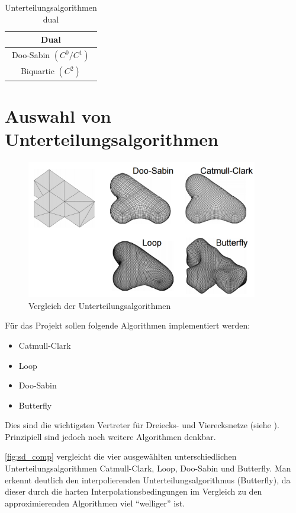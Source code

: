 \begin{table}
\center
\caption{Unterteilungsalgorithmen dual \cite[S. 65]{Zorin.subdivcourse} \cite{Standford.24.07.2015}}
\label{tab:sd_comp_dual}
\begin{tabular}{c}
\\
\hline
\textbf{Dual}\\
\hline
Doo-Sabin \((C^0/C^1)\) \\
Biquartic \((C^2)\) \\
\end{tabular}
\end{table}

\section{Auswahl von Unterteilungsalgorithmen}

\begin{figure}
  \centering
  \includegraphics[width=0.9\textwidth]{content/media/sd_overview.png}
  \caption{Vergleich der Unterteilungsalgorithmen \cite{Standford.24.07.2015}}
  \label{fig:sd_comp}
\end{figure}

Für das Projekt sollen folgende Algorithmen implementiert werden:
\begin{itemize}
	\item Catmull-Clark
	\item Loop
	\item Doo-Sabin
	\item Butterfly
\end{itemize}
Dies sind die wichtigsten Vertreter für Dreiecks- und Vierecksnetze
(siehe \cite[S. 65ff]{Zorin.subdivcourse} \cite{Standford.24.07.2015}).
Prinzipiell sind jedoch noch weitere Algorithmen denkbar.

\autoref{fig:sd_comp} vergleicht die vier ausgewählten
unterschiedlichen Unterteilungsalgorithmen Catmull-Clark, Loop, Doo-Sabin und Butterfly.
Man erkennt deutlich den interpolierenden Unterteilungsalgorithmus (Butterfly),
da dieser durch die harten Interpolationsbedingungen im
Vergleich zu den approximierenden Algorithmen viel \enquote{welliger} ist.
\cite{Zorin.subdivcourse}








